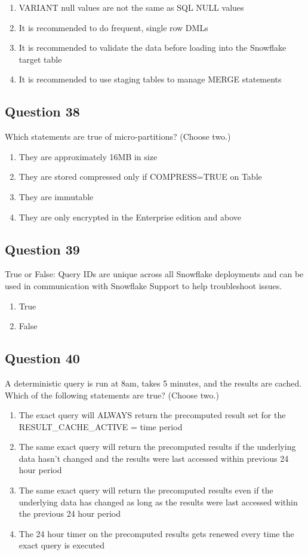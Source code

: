 \documentclass[12pt]{article}
\begin{document}
\begin{enumerate}[label=\Alph*.]
  \item VARIANT null values are not the same as SQL NULL values
  \item It is recommended to do frequent, single row DMLs
  \item It is recommended to validate the data before loading into the Snowflake target table
  \item It is recommended to use staging tables to manage MERGE statements
\end{enumerate}

\subsection*{Question 38}
Which statements are true of micro-partitions? (Choose two.)

\begin{enumerate}[label=\Alph*.]
  \item They are approximately 16MB in size
  \item They are stored compressed only if COMPRESS=TRUE on Table
  \item They are immutable
  \item They are only encrypted in the Enterprise edition and above
\end{enumerate}

\subsection*{Question 39}
True or False: Query IDs are unique across all Snowflake deployments and can be used in communication with Snowflake Support to help troubleshoot issues.

\begin{enumerate}[label=\Alph*.]
  \item True
  \item False
\end{enumerate}

\subsection*{Question 40}
A deterministic query is run at 8am, takes 5 minutes, and the results are cached. Which of the following statements are true? (Choose two.)

\begin{enumerate}[label=\Alph*.]
  \item The exact query will ALWAYS return the precomputed result set for the RESULT\_CACHE\_ACTIVE = time period
  \item The same exact query will return the precomputed results if the underlying data hasn’t changed and the results were last accessed within previous 24 hour period
  \item The same exact query will return the precomputed results even if the underlying data has changed as long as the results were last accessed within the previous 24 hour period
  \item The 24 hour timer on the precomputed results gets renewed every time the exact query is executed
\end{enumerate}
\end{document}

